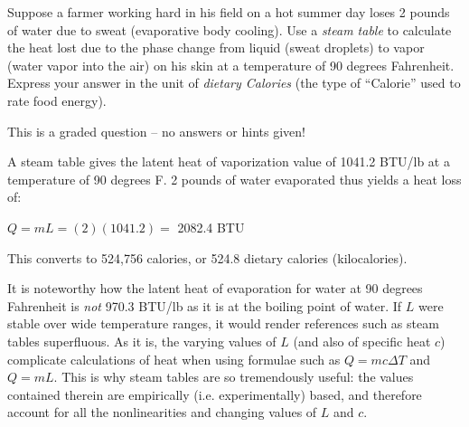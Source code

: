 

Suppose a farmer working hard in his field on a hot summer day loses 2 pounds of water due to sweat (evaporative body cooling).  Use a {\it steam table} to calculate the heat lost due to the phase change from liquid (sweat droplets) to vapor (water vapor into the air) on his skin at a temperature of 90 degrees Fahrenheit.  Express your answer in the unit of {\it dietary Calories} (the type of ``Calorie'' used to rate food energy).

\vfil 

\eject






This is a graded question -- no answers or hints given!







A steam table gives the latent heat of vaporization value of 1041.2 BTU/lb at a temperature of 90 degrees F.  2 pounds of water evaporated thus yields a heat loss of:

\vskip 10pt

$Q = mL = (2)(1041.2) =$ 2082.4 BTU

\vskip 10pt

This converts to 524,756 calories, or 524.8 dietary calories (kilocalories). 

\vskip 20pt

It is noteworthy how the latent heat of evaporation for water at 90 degrees Fahrenheit is {\it not} 970.3 BTU/lb as it is at the boiling point of water.  If $L$ were stable over wide temperature ranges, it would render references such as steam tables superfluous.  As it is, the varying values of $L$ (and also of specific heat $c$) complicate calculations of heat when using formulae such as $Q = mc \Delta T$ and $Q = mL$.  This is why steam tables are so tremendously useful: the values contained therein are empirically (i.e. experimentally) based, and therefore account for all the nonlinearities and changing values of $L$ and $c$.






